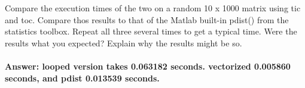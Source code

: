 \documentclass[11pt]{article}
\begin{document}
Compare the execution times of the two on a random 10 x 1000 matrix
using tic and toc. Compare thos results to that of the Matlab built-in
pdist() from the statistics toolbox. Repeat all three several times to
get a typical time. Were the results what you expected? Explain why the
results might be so.

\hypertarget{answer-looped-version-takes-0.063182-seconds.-vectorized-0.005860-seconds-and-pdist-0.013539-seconds.}{%
\paragraph{Answer: looped version takes 0.063182 seconds. vectorized
0.005860 seconds, and pdist 0.013539
seconds.}\label{answer-looped-version-takes-0.063182-seconds.-vectorized-0.005860-seconds-and-pdist-0.013539-seconds.}}
\end{document}
